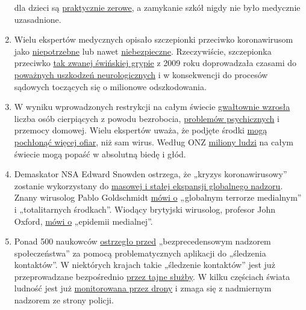 \begin{enumerate}
  dla dzieci są
  \href{https://www.thelancet.com/journals/lanchi/article/PIIS2352-4642(20)30095-X/fulltext}{praktycznie
  zerowe}, a zamykanie szkół nigdy nie było medycznie uzasadnione.
\item
  Wielu ekspertów medycznych opisało szczepionki przeciwko koronawirusom
  jako \href{https://www.youtube.com/watch?v=vrL9QKGQrWk}{niepotrzebne}
  lub nawet
  \href{https://www.nature.com/articles/d41586-020-00751-9}{niebezpieczne}.
  Rzeczywiście, szczepionka przeciwko
  \href{https://www.forbes.com/2010/02/05/world-health-organization-swine-flu-pandemic-opinions-contributors-michael-fumento.html\#658c006c48e8}{tak
  zwanej świńskiej grypie} z 2009 roku doprowadzała czasami do
  \href{https://www.ibtimes.co.uk/brain-damaged-uk-victims-swine-flu-vaccine-get-60-million-compensation-1438572}{poważnych
  uszkodzeń neurologicznych} i w konsekwencji do procesów sądowych
  toczących się o milionowe odszkodowania.
\item
  W wyniku wprowadzonych restrykcji na całym świecie
  \href{https://www.reuters.com/article/us-health-coronavirus-usa-layoffs/us-weekly-jobless-claims-seen-at-record-high-again-idUSKBN21K0FX}{gwałtownie
  wzrosła} liczba osób cierpiących z powodu bezrobocia,
  \href{https://www.indystar.com/story/news/health/2020/04/03/coronavirus-indiana-how-get-help-mental-health-addiction/5104357002/}{problemów
  psychicznych} i przemocy domowej. Wielu ekspertów uważa, że podjęte
  środki
  \href{https://www.nytimes.com/2020/03/20/opinion/coronavirus-pandemic-social-distancing.html}{mogą
  pochłonąć więcej ofiar}, niż sam wirus. Według ONZ
  \href{https://www.theguardian.com/global-development/2020/apr/21/coronavirus-pandemic-will-cause-famine-of-biblical-proportions}{miliony
  ludzi} na całym świecie mogą popaść w absolutną biedę i głód.
\item
  Demaskator NSA Edward Snowden ostrzega, że „kryzys koronawirusowy''
  zostanie wykorzystany do
  \href{https://www.youtube.com/watch?v=-pcQFTzck_c}{masowej i stałej
  ekspansji globalnego nadzoru}. Znany wirusolog Pablo Goldschmidt
  \href{https://www.rubikon.news/artikel/der-corona-totalitarismus}{mówi
  o} „globalnym terrorze medialnym'' i „totalitarnych środkach''.
  Wiodący brytyjski wirusolog, profesor John Oxford,
  \href{https://novuscomms.com/2020/03/31/a-view-from-the-hvivo-open-orphan-orph-laboratory-professor-john-oxford/}{mówi
  o} „epidemii medialnej''.
\item
  Ponad 500 naukowców
  \href{https://www.esat.kuleuven.be/cosic/sites/contact-tracing-joint-statement/}{ostrzegło
  przed} „bezprecedensowym nadzorem społeczeństwa'' za pomocą
  problematycznych aplikacji do „śledzenia kontaktów''. W niektórych
  krajach takie „śledzenie kontaktów'' jest już przeprowadzane
  bezpośrednio
  \href{https://www.jewishpress.com/news/the-courts/state-to-high-court-even-more-shin-bet-involvement-in-fighting-the-coronavirus/2020/04/14/}{przez
  tajne służby}. W kilku częściach świata ludność jest już
  \href{https://off-guardian.org/2020/04/25/50-headlines-darker-more-of-the-new-normal/}{monitorowana
  przez drony} i zmaga się z nadmiernym nadzorem ze strony policji.
\end{enumerate}

